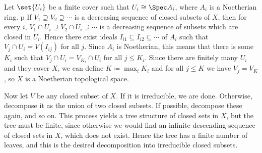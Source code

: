 Let $\set{U_i}$ be a finite cover such that $U_i\cong \Spec A_i$, where $A_i$
is a Noetherian ring.
p
If $V_1 \supseteq V_2\supseteq \cdots$ is a decreasing sequence of closed
subsets of $X$, then for every $i$,
$V_1 \cap U_i\supseteq V_2\cap U_i \supseteq \cdots$ is a decreasing sequence
of subsets which are closed in $U_i$. Hence there exist ideals
$I_{i1} \subseteq I_{i2} \subseteq\cdots$ of $A_i$ such that $V_j\cap U_i = V(I_{ij})$
for all $j$. Since $A_i$ is Noetherian, this means that there is some $K_i$ such
that $V_j\cap U_i = V_{K_i} \cap U_i$ for all $j \leq K_i$. Since there are finitely
many $U_i$ and they cover $X$, we can define $K\coloneqq \max_i K_i$ and
for all $j \leq K$ we have $V_j = V_K$, so $X$ is a Noetherian topological space.

Now let $V$ be any closed subset of $X$. If it is irreducible, we are done.
Otherwise, decompose it as the union of two closed subsets. If possible, decompose
these again, and so on. This process yields a tree structure of closed
sets in $X$, but the tree must be finite, since otherwise we would find an infinite
descending sequence of closed sets in $X$, which does not exist. Hence the tree has
a finite number of leaves, and this is the desired decomposition into irreducible
closed subsets.
